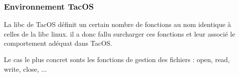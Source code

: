 \subsubsection{Environnement TacOS}

La libc de TacOS définit un certain nombre de fonctions au nom identique à celles de la libc linux. il a donc fallu surcharger ces fonctions et leur associé le comportement adéquat dans TacOS.

Le cas le plus concret sonts les fonctions de gestion des fichiers : open, read, write, close, ...


